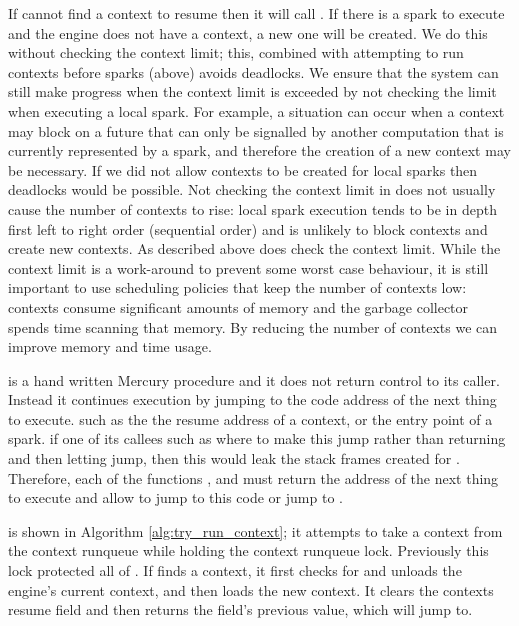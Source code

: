 If \idle cannot find a context to resume then it
will call \tryrunlocalspark.
If there is a spark to execute and the engine does not have a context,
a new one will be created.
We do this without checking the context limit;
this, combined with attempting to run contexts before sparks (above)
avoids deadlocks.
We ensure that the system can still make progress when the context limit is
exceeded by not checking the limit when executing a local spark.
For example,
a situation can occur when a context may block on
a future that can only be signalled by another computation that is currently
represented by a spark, and therefore the creation of a new context may be
necessary.
If we did not allow contexts to be created for local sparks then deadlocks
would be possible.
Not checking the context limit in \tryrunlocalspark does not usually cause
the number of contexts to rise:
local spark execution tends to be in depth first left to right order
(sequential order) and is unlikely to block contexts and create new
contexts.
As described above \trystealspark does check the context limit.
While the context limit is a work-around to prevent some worst case
behaviour,
it is still important to use scheduling policies that keep the number of
contexts low:
contexts consume significant amounts of memory and
the garbage collector spends time scanning that memory.
By reducing the number of contexts we can improve memory and time usage.

\idle is a hand written Mercury procedure and it does not return control to
its caller.
Instead it continues execution by jumping to the code address of the next
thing to execute.
such as the
the resume address of a context,
or the entry point of a spark.
if one of its callees such as \trystealspark where to make this jump rather
than returning and then letting \idle jump,
then this would leak the stack frames created for \trystealspark.
Therefore, each of the functions \tryrunlocalspark, \tryruncontext and
\trystealspark must return the address of the next thing to execute and
allow \idle to jump to this code or jump to \sleep.

\tryruncontext is shown in Algorithm \ref{alg:try_run_context};
it attempts to take a context from the context runqueue while holding the
context runqueue lock.
Previously this lock protected all of \idle.
If \tryruncontext finds a context,
it first checks for and unloads the engine's current context,
and then loads the new context.
It clears the contexts resume field and then returns the field's previous
value, which \idle will jump to.

